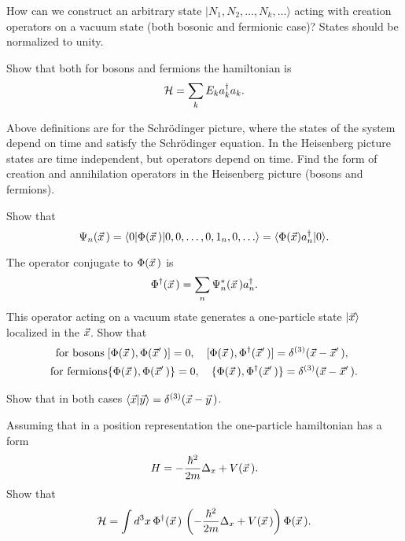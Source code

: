 \documentclass[a4paper,11pt]{article}
\begin{document}
\begin{enumerate}
  How can we construct an arbitrary state
  $| N_{ 1 }, N_{ 2 }, \ldots, N_{ k }, \ldots \rangle$ acting with creation operators
  on a vacuum state (both bosonic and fermionic case)? States should
  be normalized to unity.

  Show that both for bosons and fermions the hamiltonian is
  \begin{equation}
    \label{eq:19}
    \mathcal{H} = \sum_{ k } E_{ k } a_{ k }^{ \dagger } a_{ k }.
  \end{equation}

  Above definitions are for the Schr\"{o}dinger picture, where the states of the system depend on time and satisfy the Schr\"{o}dinger equation. In the Heisenberg picture states are time independent, but operators depend on time. Find the form of creation and annihilation operators in the Heisenberg picture (bosons and fermions).

  Show that
  \begin{equation}
    \label{eq:22}
    \Psi_{ n }( \vec{ x } \, ) =
    \langle 0 | \Phi( \vec{ x } \, ) | 0, 0, \ldots, 0, 1_{ n }, 0, \ldots \rangle
    = \langle \Phi( \vec{ x } ) a_{ n }^{ \dagger } | 0 \rangle.
  \end{equation}

  The operator conjugate to $\Phi( \vec{ x } \, )$ is
  \begin{equation}
    \label{eq:23}
    \Phi^{ \dagger }( \vec{ x } \, ) =
    \sum_{ n } \Psi_{ n }^{ * }( \vec{ x } \, ) a_{ n }^{ \dagger }.
  \end{equation}
  This operator acting on a vacuum state generates a one-particle state $| \vec{ x } \rangle$ localized in the $\vec{ x }$. Show that
  \begin{align}
    \textrm{for bosons} \;
    &[ \Phi( \vec{ x } \, ), \Phi( \vec{ x }' \, ) ] = 0, \quad
      [ \Phi( \vec{ x } \, ), \Phi^{ \dagger }( \vec{ x }' \, ) ]
      = \delta^{ ( 3 ) }( \vec{ x } - \vec{ x }' \, ), \\
    \textrm{for fermions}
    &\{ \Phi( \vec{ x } \, ), \Phi( \vec{ x }' \, ) \} = 0, \quad
    \{ \Phi( \vec{ x } \, ), \Phi^{ \dagger }( \vec{ x }' \, ) \}
    = \delta^{ ( 3 ) }( \vec{ x } - \vec{ x }' \, ).
  \end{align}

  Show that in both cases $\langle \vec{ x } | \vec{ y } \rangle = \delta^{ ( 3 ) }( \vec{ x } - \vec{ y } \, )$.

  Assuming that in a position representation the one-particle hamiltonian has a form
  \begin{equation}
    \label{eq:24}
    H = -\frac{ \hbar^{ 2 } }{ 2m } \Delta_{ x } + V( \vec{ x } \, ).
  \end{equation}
  Show that
  \begin{equation}
    \label{eq:25}
    \mathcal{H} =
    \int d^{ 3 } x \, \Phi^{ \dagger }( \vec{ x } \, ) \,
    \left( -\frac{ \hbar^{ 2 } }{ 2m } \Delta_{ x } + V( \vec{ x } \, ) \right)
    \Phi( \vec{ x } \, ).
  \end{equation}


\end{enumerate}
\end{document}
